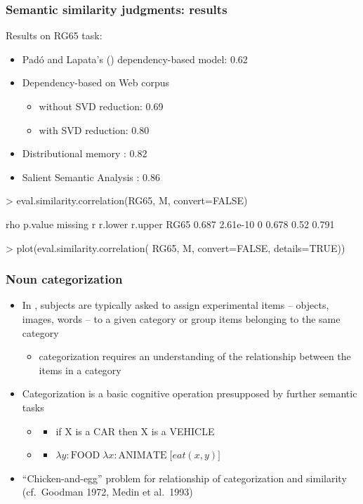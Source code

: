 \documentclass[t]{beamer} %
\begin{document}
\begin{frame}[fragile]
\frametitle{Semantic similarity judgments: results}

Results on RG65 task:
\begin{itemize}
\item Padó and Lapata's (\citeyear{Pado:Lapata:07}) dependency-based model: 0.62
\item Dependency-based on Web corpus \citep{Herdagdelen:Erk:Baroni:09}
  \begin{itemize}
  \item without SVD reduction: 0.69
  \item with SVD reduction: 0.80
  \end{itemize}
\item Distributional memory \citep{Baroni:Lenci:10}: 0.82
\item Salient Semantic Analysis \citep{Hassan:Mihalcea:11}: 0.86
\end{itemize}


\begin{Rcode}
> eval.similarity.correlation(RG65, M, convert=FALSE)\begin{Rout}
       rho  p.value missing     r r.lower r.upper
RG65 0.687 2.61e-10       0 0.678    0.52   0.791\end{Rout}
> plot(eval.similarity.correlation( 
       RG65, M, convert=FALSE, details=TRUE))
\end{Rcode}
\end{frame}


\begin{frame}
\frametitle{Noun categorization}

\begin{itemize}
\item In , subjects are typically asked to assign experimental items -- objects, images, words -- to a given category or group items belonging to the same category
\begin{itemize}
\item categorization requires an understanding of the relationship between the items in a category
\end {itemize}
\item Categorization is a basic cognitive operation presupposed by further semantic tasks
\begin{itemize}
\item {}
\begin{itemize}
\item if X is a CAR then X is a VEHICLE
\end{itemize}
\item {}
\begin{itemize}
\item $\lambda y: \text{FOOD}\; \lambda x:\text{ANIMATE} \; \bigl[ eat(x,y) \bigr]$
\end{itemize}
\end{itemize}
\item ``Chicken-and-egg'' problem for relationship of categorization and similarity (cf.\ Goodman 1972, Medin et al.\ 1993)
\end{itemize}
\end{frame}
\end{document}
